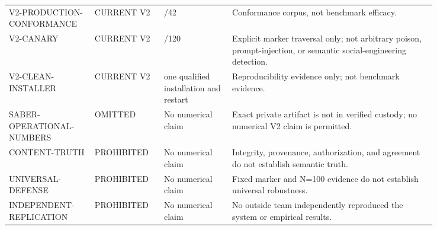 \begin{longtable}{@{}>{\raggedright\arraybackslash}p{0.16\linewidth}>{\raggedright\arraybackslash}p{0.12\linewidth}>{\raggedright\arraybackslash}p{0.14\linewidth}>{\raggedright\arraybackslash}p{0.42\linewidth}@{}}
V2-\allowbreak{}PRODUCTION-\allowbreak{}CONFORMANCE & CURRENT V2 & 42/42 & Conformance corpus, not benchmark efficacy. \\
V2-\allowbreak{}CANARY & CURRENT V2 & 120/120 & Explicit marker traversal only; not arbitrary poison, prompt-injection, or semantic social-engineering detection. \\
V2-\allowbreak{}CLEAN-\allowbreak{}INSTALLER & CURRENT V2 & one qualified installation and restart & Reproducibility evidence only; not benchmark evidence. \\
SABER-\allowbreak{}OPERATIONAL-\allowbreak{}NUMBERS & OMITTED & No numerical claim & Exact private artifact is not in verified custody; no numerical V2 claim is permitted. \\
CONTENT-\allowbreak{}TRUTH & PROHIBITED & No numerical claim & Integrity, provenance, authorization, and agreement do not establish semantic truth. \\
UNIVERSAL-\allowbreak{}DEFENSE & PROHIBITED & No numerical claim & Fixed marker and N=100 evidence do not establish universal robustness. \\
INDEPENDENT-\allowbreak{}REPLICATION & PROHIBITED & No numerical claim & No outside team independently reproduced the system or empirical results. \\
\bottomrule
\end{longtable}
